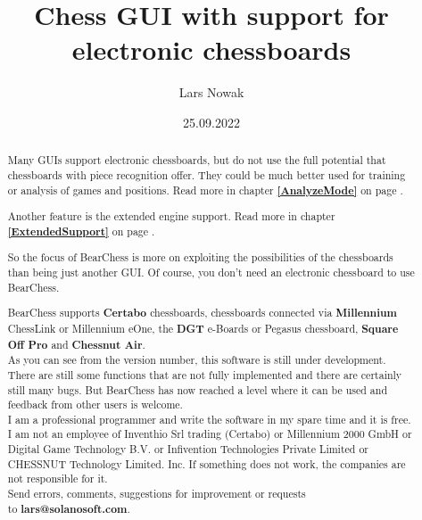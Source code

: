 \documentclass[11pt,a4paper]{article}
\title{Chess GUI with support for electronic chessboards}
\author{Lars Nowak}
\date{25.09.2022}
\begin{document}
\maketitle

\begin{abstract}

Many GUIs support electronic chessboards, but do not use the full potential that chessboards with piece recognition offer. They could be much better used for training or analysis of games and positions. Read more in chapter \textbf{\ref{AnalyzeMode}  } on page \pageref{AnalyzeMode}.

Another feature is the extended engine support. Read more in chapter \textbf{\ref{ExtendedSupport}  } on page \pageref{ExtendedSupport}.

So the focus of BearChess is more on exploiting the possibilities of the chessboards than being just another GUI. Of course, you don't need an electronic chessboard to use BearChess.

BearChess supports \textbf{Certabo} chessboards, chessboards connected via \textbf{Millennium} ChessLink or Millennium eOne, the \textbf{DGT} e-Boards or Pegasus chessboard, \textbf{Square Off Pro} and \textbf{Chessnut Air}.\\

As you can see from the version number, this software is still under development. There are still some functions that are not fully implemented and there are certainly still many bugs. But BearChess has now reached a level where it can be used and feedback from other users is welcome.\\

I am a professional programmer and write the software in my spare time and it is free. I am not an employee of Inventhio Srl trading (Certabo) or Millennium 2000 GmbH or Digital Game Technology B.V. or Infivention Technologies Private Limited or CHESSNUT Technology Limited. Inc. If something does not work, the companies are not responsible for it.\\

Send errors, comments, suggestions for improvement or requests\\to \textbf{lars@solanosoft.com}.

\end{abstract}

\newpage
\tableofcontents
\newpage
\end{document}
